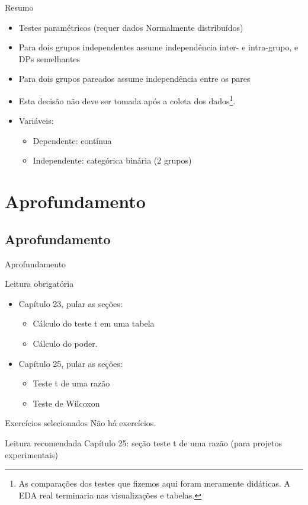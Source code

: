 \documentclass{beamer}
\begin{document}
\begin{frame}{Resumo}
  \begin{itemize}
    \small
  \item Testes paramétricos ({\footnotesize requer dados Normalmente distribuídos})
  \item Para dois grupos independentes assume independência inter- e intra-grupo, e DPs semelhantes
  \item Para dois grupos pareados assume independência entre os pares
  \item Esta decisão \alert{não deve} ser tomada após a coleta dos dados\footnote{\scriptsize As comparações dos testes que fizemos aqui foram meramente didáticas. A EDA real terminaria nas visualizações e tabelas.}.
  \item Variáveis:
    \begin{itemize}
    \item Dependente: contínua
    \item Independente: categórica binária (2 grupos)
    \end{itemize}
  \end{itemize}
\end{frame}

\section{Aprofundamento}

\subsection{Aprofundamento}

\begin{frame}{Aprofundamento}
  \begin{block}{Leitura obrigatória}
    \begin{itemize}
      \small
    \item Capítulo 23, pular as seções:
      \begin{itemize}
        \scriptsize
      \item Cálculo do teste t em uma tabela
      \item Cálculo do poder.
      \end{itemize}
    \item Capítulo 25, pular as seções:
      \begin{itemize}
        \scriptsize
      \item Teste t de uma razão
      \item Teste de Wilcoxon
      \end{itemize}
    \end{itemize}
  \end{block}
  \begin{block}{Exercícios selecionados}
    \footnotesize
    Não há exercícios.
  \end{block}
  \begin{block}{Leitura recomendada}
    \footnotesize
    Capítulo 25: seção teste t de uma razão (para projetos experimentais)
  \end{block}
\end{frame}
\end{document}
